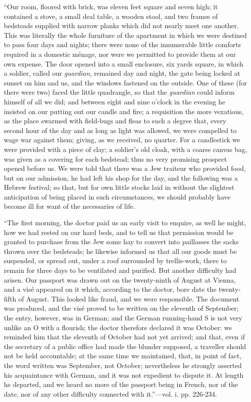 ``Our
room, floored with brick, was eleven feet square and seven high; it
contained a stove, a small deal table, a wooden stool, and two frames of
bedsteads supplied with narrow planks which did not nearly meet one
another. This was literally the whole furniture of the apartment in
which we were destined to pass four days and nights; there were none of
the innumerable little comforts required in a domestic ménage, nor were
we permitted to provide them at our own expense. The door opened into a
small enclosure, six yards square, in which a soldier, called our \emph{guardian},
remained day and night, the gate being locked at sunset on him and us,
and the windows fastened on the outside. One of these (for there were
two) faced the little quadrangle, so
that the \emph{guardian} could inform himself of all we did; and between
eight and nine o'clock in the evening he insisted on our putting out our
candle and fire; a requisition the more vexatious, as the place swarmed
with field-bugs and fleas to such a degree that, every second hour of
the day and as long as light was allowed, we were compelled to wage war
against them; giving, as we received, no quarter. For a candlestick we
were provided with a piece of clay; a soldier's old cloak, with a coarse
canvas bag, was given as a covering for each bedstead; thus no very
promising prospect opened before us. We were told that there was a Jew
traiteur who provided food, but on our admission, he had left his shop
for the day, and the following was a Hebrew festival; so that, but for
own little stocks laid in without the
slightest anticipation of being placed in such circumstances, we should
probably have become ill for want of the necessaries of life.

``The
first morning, the doctor paid us an early visit to enquire, as well he
might, how we had rested on our hard beds, and to tell us that
permission would be granted to purchase from the Jew some hay to convert
into paillasses the sacks thrown over the bedsteads; he likewise
informed us that all our goods must be suspended, or spread out, under a
roof surrounded by trellis-work, there to remain for three days to be
ventilated and purified. But another difficulty had arisen. Our passport
was drawn out on the twenty-ninth of August at Vienna, and a visé
appeared on it which, according to the doctor, bore date the
twenty-fifth of August. This looked like fraud, and we were responsible.
The document was produced, and the visé proved to be written on the
eleventh of September; the entry, however, was in German; and the German
running-hand S is not very unlike an O with a flourish; the doctor
therefore declared it was October: we reminded him that the eleventh of
October had not yet arrived; and that, even if the secretary of a public
office had made the blunder supposed, a traveller should not be held
accountable; at the same time we maintained, that, in point of fact, the
word written was September, not October; nevertheless he strongly
asserted his acquaintance with German, and it was not expedient to
dispute it. At length he departed, and we heard no more of the passport
being in French, nor of the date, nor of any other difficulty connected
with it.''—vol. i. pp. 226-234.

